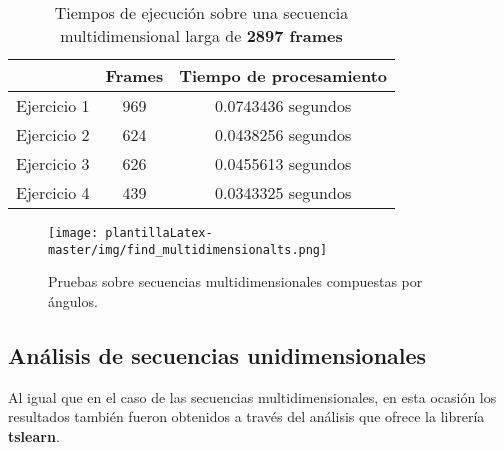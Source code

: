 \begin{table}[]
\centering
\begin{tabular}{lcc}
\hline
\rowcolor[HTML]{EFEFEF} 
\multicolumn{1}{c}{\cellcolor[HTML]{EFEFEF}\textbf{Ejercicio}} & \multicolumn{1}{l}{\cellcolor[HTML]{EFEFEF}\textbf{Frames}} & \multicolumn{1}{l}{\cellcolor[HTML]{EFEFEF}\textbf{Tiempo de procesamiento}} \\ \hline
\rowcolor[HTML]{ECF4FF} 
Ejercicio 1                                                    & 969                                                         & 0.0743436 segundos                                                           \\
\rowcolor[HTML]{EFEFEF} 
Ejercicio 2                                                    & 624                                                         & 0.0438256 segundos                                                           \\
\rowcolor[HTML]{ECF4FF} 
Ejercicio 3                                                    & 626                                                         & 0.0455613 segundos                                                           \\
\rowcolor[HTML]{EFEFEF} 
Ejercicio 4                                                    & 439                                                         & 0.0343325 segundos                                                           \\ \hline
\end{tabular}
\caption{Tiempos de ejecución sobre una secuencia multidimensional larga de \textbf{2897 frames}}
\label{tiempos1}
\end{table}

\begin{figure}
    \centering
    \texttt{[image: plantillaLatex-master/img/find\_multidimensionalts.png]}
    \caption{Pruebas sobre secuencias multidimensionales compuestas por ángulos.}
    \label{fig:angprubmulti}
\end{figure}

\subsection{Análisis de secuencias unidimensionales}

Al igual que en el caso de las secuencias multidimensionales, en esta ocasión los resultados también fueron obtenidos a través del análisis que ofrece la librería \textbf{tslearn}. 

